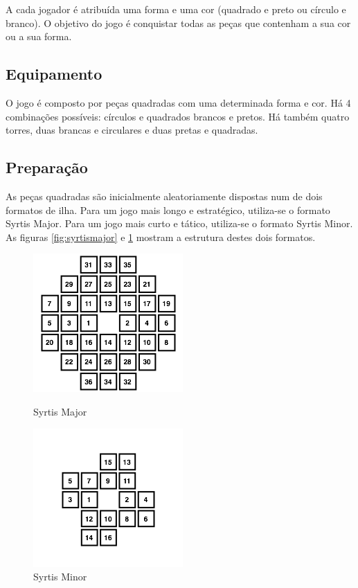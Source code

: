 \documentclass[a4paper]{article}
\begin{document}
	A cada jogador é atribuída uma forma e uma cor (quadrado e preto ou círculo e branco). O objetivo do jogo é conquistar todas as peças que contenham a sua cor ou a sua forma.
	
\subsection{Equipamento}

	O jogo é composto por peças quadradas com uma determinada forma e cor. Há 4 combinações possíveis: círculos e quadrados brancos e pretos. Há também quatro torres, duas brancas e circulares e duas pretas e quadradas.
	
\subsection{Preparação}

	As peças quadradas são inicialmente aleatoriamente dispostas num de dois formatos de ilha. Para um jogo mais longo e estratégico, utiliza-se o formato Syrtis Major. Para um jogo mais curto e tático, utiliza-se o formato Syrtis Minor. As figuras \ref{fig:syrtismajor} e \ref{fig:syrtisminor} mostram a estrutura destes dois formatos.
	
\begin{figure}[h]

\begin{minipage}{0.5\linewidth}
\centering
\includegraphics[scale=0.9]{syrtismajor.png}
\caption{Syrtis Major}
\label{fig:syrtismajor}
\end{minipage}
\quad
\begin{minipage}{0.5\linewidth}
\centering
\includegraphics[scale=0.9]{syrtisminor.png}
\caption{Syrtis Minor}
\label{fig:syrtisminor}
\end{minipage}

\end{figure}
\end{document}
